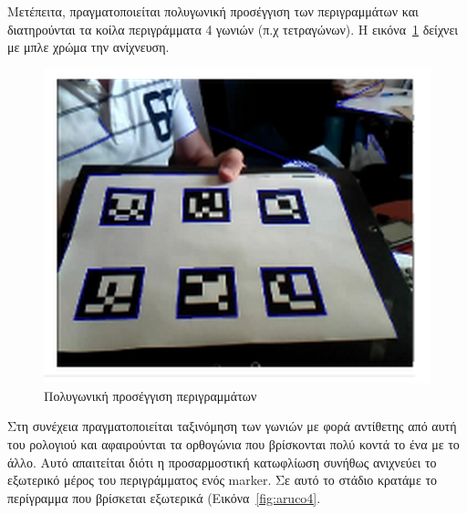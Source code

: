 Μετέπειτα, πραγματοποιείται πολυγωνική προσέγγιση των περιγραμμάτων και διατηρούνται τα κοίλα περιγράμματα 4 γωνιών (π.χ τετραγώνων). Η εικόνα~\ref{fig:aruco3} δείχνει με μπλε χρώμα την ανίχνευση.


\begin{figure}[H]
    \centering
    \includegraphics[scale=0.6, angle=0]{Files/Figures/aruco3.png}
    \caption[Πολυγωνική προσέγγιση περιγραμμάτων]{Πολυγωνική προσέγγιση περιγραμμάτων}
    \label{fig:aruco3}
\end{figure}



Στη συνέχεια πραγματοποιείται ταξινόμηση των γωνιών με φορά αντίθετης από αυτή του ρολογιού και αφαιρούνται τα ορθογώνια που βρίσκονται πολύ κοντά το ένα με το άλλο. Αυτό απαιτείται διότι η προσαρμοστική κατωφλίωση συνήθως ανιχνεύει το εξωτερικό μέρος του περιγράμματος ενός marker. Σε αυτό το στάδιο κρατάμε το περίγραμμα που βρίσκεται εξωτερικά (Εικόνα~\ref{fig:aruco4}.


